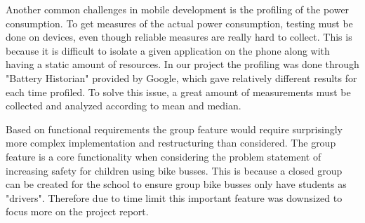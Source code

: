 Another common challenges in mobile development is the profiling of the power consumption. To get measures of the actual power consumption, testing must be done on devices, even though reliable measures are really hard to collect. This is because it is difficult to isolate a given application on the phone along with having a static amount of resources. In our project the profiling was done through "Battery Historian" provided by Google, which gave relatively different results for each time profiled. To solve this issue, a great amount of measurements must be collected and analyzed according to mean and median.

Based on functional requirements the group feature would require surprisingly more complex implementation and restructuring than considered. The group feature is a core functionality when considering the problem statement of increasing safety for children using bike busses. This is because a closed group can be created for the school to ensure group bike busses only have students as "drivers". Therefore due to time limit this important feature was downsized to focus more on the project report. 
